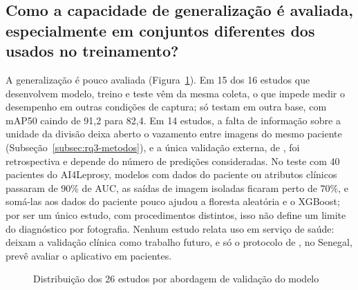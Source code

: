 \subsection{Como a capacidade de generalização é avaliada, especialmente em conjuntos diferentes dos usados no treinamento?}
\label{subsec:rq7-generalizacao}

A generalização é pouco avaliada (Figura~\ref{fig:tipos-validacao}). Em
15 dos 16 estudos que desenvolvem modelo, treino e teste vêm da mesma coleta, o que
impede medir o desempenho em outras condições de captura; só 
testam em outra base, com mAP50 caindo de 91,2 para 82,4. Em 14 estudos, a
falta de informação sobre a unidade da divisão deixa aberto o vazamento
entre imagens do mesmo paciente (Subseção~\ref{subsec:rq3-metodos}), e a
única validação externa, de , foi retrospectiva e depende do número
de predições consideradas. No teste com 40 pacientes do AI4Leprosy,
modelos com dados do paciente ou atributos clínicos passaram de 90\% de
AUC, as saídas de imagem isoladas ficaram perto de 70\%, e somá-las aos
dados do paciente pouco ajudou a floresta aleatória e o XGBoost; por ser
um único estudo, com procedimentos distintos, isso não define um limite do
diagnóstico por fotografia. Nenhum estudo relata uso em serviço de saúde:
 deixam a validação clínica como trabalho futuro, e
só o protocolo de , no Senegal, prevê avaliar o
aplicativo em pacientes.

\begin{figure}[htbp]
	\centering
	\caption{Distribuição dos 26 estudos por abordagem de validação do modelo}
	\label{fig:tipos-validacao}
\end{figure}

